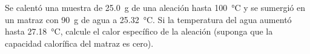 Se calentó una muestra de \SI{25,0}{\gram} de una aleación hasta \SI{100}{\celsius} y se sumergió en un matraz con \SI{90}{\gram} de agua a \SI{25,32}{\celsius}. Si la temperatura del agua aumentó hasta \SI{27,18}{\celsius}, calcule el calor específico de la aleación (suponga que la capacidad calorífica del matraz es cero).
